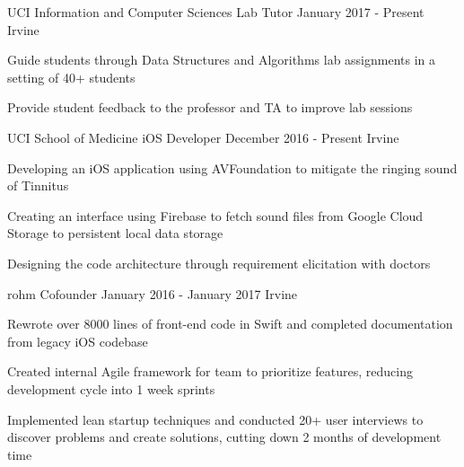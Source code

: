 

\begin{cventries}

  \cventry
    {UCI Information and Computer Sciences} %
    {Lab Tutor} %
    {January 2017 - Present} %
    {Irvine} %
    {
      \begin{cvitems}
      	\item Guide students through Data Structures and Algorithms lab assignments in a setting of 40+ students
      	\item Provide student feedback to the professor and TA to improve lab sessions
      \end{cvitems}
    }

  \cventry
    {UCI School of Medicine} %
    {iOS Developer} %
    {December 2016 - Present} %
    {Irvine} %
    {
      \begin{cvitems} %
        \item Developing an iOS application using AVFoundation to mitigate the ringing sound of Tinnitus
        \item Creating an interface using Firebase to fetch sound files from Google Cloud Storage to persistent local data storage
        \item Designing the code architecture through requirement elicitation with doctors
      \end{cvitems}
    }

  \cventry
    {rohm} %
    {Cofounder} %
    {January 2016 - January 2017} %
    {Irvine} %
    {
      \begin{cvitems} %
        \item Rewrote over 8000 lines of front-end code in Swift and completed documentation from legacy iOS codebase
        \item Created internal Agile framework for team to prioritize features, reducing development cycle into 1 week sprints
        \item Implemented lean startup techniques and conducted 20+ user interviews to discover problems and create solutions, cutting down 2 months of development time
      \end{cvitems}
    }

\end{cventries}
